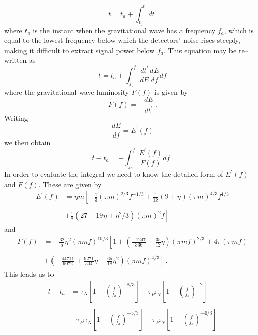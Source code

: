 \documentclass[12pt]{article}
\begin{document}
\begin{equation}
t = t_{a} + \int^{t}_{t_{a}} dt^{\prime}
\end{equation}
where $t_{a}$ is the instant when the gravitational wave has a frequency $f_{a}$, which is equal to the lowest frequency below which the detectors' noise rises steeply, making it difficult to extract signal power below $f_{a}$. This equation may be re--written as
\begin{equation}
t = t_{a} + \int^{f}_{f_{a}} \frac{dt^{\prime}}{dE} \frac{dE}{df} df
\end{equation}
where the gravitational wave luminosity $F(f)$ is given by
\begin{equation}
F(f) = -\frac{dE}{dt^{\prime}} \,.
\end{equation} 
Writing
\begin{equation}
\frac{dE}{df} = E^{\prime}(f)
\end{equation}
we then obtain
\begin{equation}
t - t_{a} = - \int^{f}_{f_{a}} \frac{E^{\prime}(f)}{F(f)} df \,.
\label{toff_int}
\end{equation}
In order to evaluate the integral we need to know the detailed form of $E^{\prime}(f)$ and $F(f)$. These are given by
\begin{equation}
\begin{split}
E^{\prime} (f) & = \eta m \left[ - \frac{1}{3} (\pi m)^{2/3} f^{-1/3} + \frac{1}{18} (9+\eta) (\pi m)^{4/3} f^{1/3} \right.\\
	       &   \\
	       &   + \left. \frac{1}{8} (27-19 \eta + \eta^{2}/3) (\pi m)^{2} f \right]
\end{split}
\label{Eoff}
\end{equation}
and 
\begin{equation}
\begin{split}
F(f) &  = - \frac{32}{5} \eta^{2} (\pi m f)^{10/3} \left[ 1 + \left( \frac{- 1247}{336} - \frac{35}{12} \eta \right) (\pi m f)^{2/3} + 4 \pi (\pi m f) \right. \\
     &   \\
     &  + \left. \left( -\frac{44711}{9072} + \frac{9271}{504} \eta + \frac{65}{18} \eta^{2} \right) (\pi m f)^{4/3} \right] \,.
\end{split}
\label{Foff}
\end{equation}
This leads us to
\begin{equation}
\begin{split}
t - t_{a} & = \tau_{N} \left[ 1 - \left( \frac{f}{f_{a}} \right)^{-8/3} \right] + \tau_{P^{1}N} \left[ 1 - \left( \frac{f}{f_{a}} \right)^{-2} \right] \\
          &     \\
          & - \tau_{P^{1.5}N} \left[ 1 - \left( \frac{f}{f_{a}} \right)^{-5/3} \right] + \tau_{P^{2}N} \left[ 1 - \left( \frac{f}{f_{a}} \right)^{-4/3} \right]
\end{split}
\label{toff1}
\end{equation}
\end{document}
